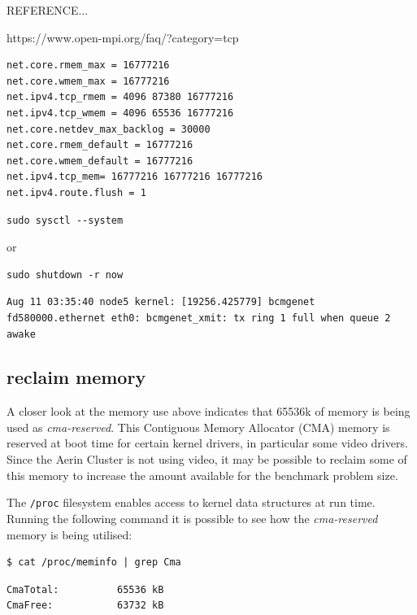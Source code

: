 \documentclass{report}
\begin{document}
REFERENCE...

https://www.open-mpi.org/faq/?category=tcp

\lstset{style=listing}
\begin{lstlisting}[caption=/etc/sysctl.d/picluster.conf]
net.core.rmem_max = 16777216
net.core.wmem_max = 16777216
net.ipv4.tcp_rmem = 4096 87380 16777216
net.ipv4.tcp_wmem = 4096 65536 16777216
net.core.netdev_max_backlog = 30000
net.core.rmem_default = 16777216
net.core.wmem_default = 16777216
net.ipv4.tcp_mem= 16777216 16777216 16777216
net.ipv4.route.flush = 1
\end{lstlisting}


\lstset{style=type}
\begin{lstlisting}
sudo sysctl --system
\end{lstlisting}

or

\lstset{style=type}
\begin{lstlisting}
sudo shutdown -r now
\end{lstlisting}




\lstset{style=type}
\begin{lstlisting}
Aug 11 03:35:40 node5 kernel: [19256.425779] bcmgenet fd580000.ethernet eth0: bcmgenet_xmit: tx ring 1 full when queue 2 awake
\end{lstlisting}



%
%
\subsection{reclaim memory}
A closer look at the memory use above indicates that 65536k of memory is being used as \emph{cma-reserved}. This Contiguous Memory Allocator (CMA) memory is reserved at boot time for certain kernel drivers, in particular some video drivers. Since the Aerin Cluster is not using video, it may be possible to reclaim some of this memory to increase the amount available for the benchmark problem size.

The \verb|/proc| filesystem enables access to kernel data structures at run time. Running the following command it is possible to see how the \emph{cma-reserved} memory is being utilised:

\lstset{style=type}
\begin{lstlisting}
$ cat /proc/meminfo | grep Cma
\end{lstlisting}

\lstset{style=type}
\begin{lstlisting}
CmaTotal:          65536 kB
CmaFree:           63732 kB
\end{lstlisting}
\end{document}
